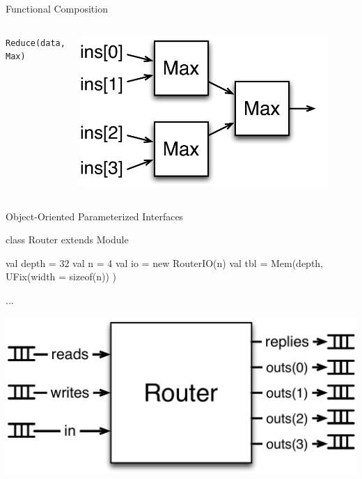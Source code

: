 \documentclass[xcolor=pdflatex,dvipsnames,table]{beamer}
\begin{document}
\begin{frame}[fragile]{Functional Composition}
\begin{columns}
\verb+Reduce(data, Max)+ \\
\begin{center}
\includegraphics[width=0.9\textwidth]{../bootcamp/figs/reduce.pdf} \\
\end{center}

\end{columns}
\end{frame}

\begin{frame}[fragile]{Object-Oriented Parameterized Interfaces}
\begin{scala}
class Router extends Module {
  val depth = 32
  val n     = 4
  val io    = new RouterIO(n)
  val tbl   = Mem(depth, UFix(width = sizeof(n)) )
  
  ...
}
\end{scala}
\begin{center}
\includegraphics[height=0.45\textheight]{../bootcamp/figs/trouter.pdf} 
\end{center}
\end{frame}
\end{document}
